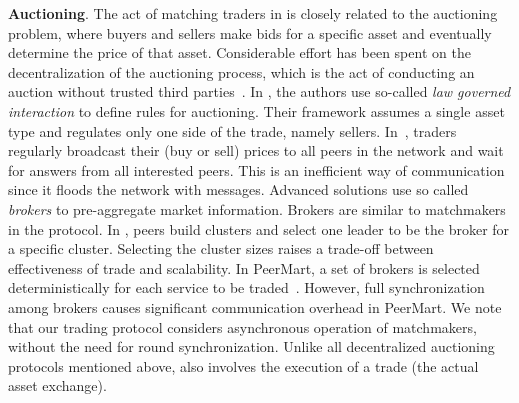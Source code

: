 \textbf{Auctioning}.
The act of matching traders in \ModelName{} is closely related to the auctioning problem, where buyers and sellers make bids for a specific asset and eventually determine the price of that asset. 
Considerable effort has been spent on the decentralization of the auctioning process, which is the act of conducting an auction without trusted third parties~\cite{fontoura2005decentralized, despotovic2004towards, ogston2002peer, hausheer2005peermart}. 
In \cite{fontoura2005decentralized}, the authors use so-called \textit{law governed interaction} to define rules for auctioning. 
Their framework assumes a single asset type and regulates only one side of the trade, namely sellers. 
In~\cite{despotovic2004towards}, traders regularly broadcast their (buy or sell) prices to all peers in the network and wait for answers from all interested peers.
This is an inefficient way of communication since it floods the network with messages. 
Advanced solutions use so called \textit{brokers} to pre-aggregate market information.
Brokers are similar to matchmakers in the \ModelName{} protocol.
In \cite{ogston2002peer}, peers build clusters and select one leader to be the broker for a specific cluster.
Selecting the cluster sizes raises a trade-off between effectiveness of trade and scalability. 
In PeerMart, a set of brokers is selected deterministically for each service to be traded~\cite{hausheer2005peermart}. 
However, full synchronization among brokers causes significant communication overhead in PeerMart.
We note that our \ModelName{} trading protocol considers asynchronous operation of matchmakers, without the need for round synchronization. 
Unlike all decentralized auctioning protocols mentioned above, \ModelName{} also involves the execution of a trade (the actual asset exchange).

